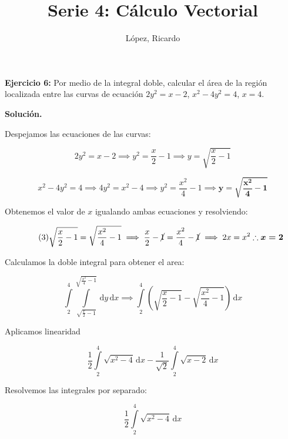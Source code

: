\documentclass[12pt]{article}
\title{Serie 4: Cálculo Vectorial}
\author{López, Ricardo}
\begin{document}
	
\newcommand{\Int}{\int\limits}

\noindent \textbf{Ejercicio 6:} Por medio de la integral doble, calcular el área de la región localizada entre las curvas de ecuación $2y^2=x-2$, $x^2-4y^2=4$, $x=4$.

\vspace{5mm}

\noindent \textbf{Solución.}

\vspace{5mm}

\noindent Despejamos las ecuaciones de las curvas:

\begin{equation}\tag{1}
	2y^2 = x-2 \implies y^2 = \frac{x}{2}-1 \implies y = \sqrt{\frac{x}{2}-1}
\end{equation}

\begin{equation}\tag{2}
	x^2-4y^2=4 \implies 4y^2=x^2-4 \implies y^2=\frac{x^2}{4}-1 \implies \boldsymbol{y=\sqrt{\frac{x^2}{4}-1}} 
\end{equation}

\noindent Obtenemos el valor de $x$ igualando ambas ecuaciones y resolviendo:

\begin{equation}\tag{3}
	\sqrt{\frac{x}{2}-1}=\sqrt{\frac{x^2}{4}-1} \implies \frac{x}{2}-\cancel{1}=\frac{x^2}{4}-\cancel{1} \implies 2x = x^2 \therefore \boldsymbol{x=2}
\end{equation}

\noindent Calculamos la doble integral para obtener el area:

\begin{equation}\tag{4}
	\Int_2^4 \Int_{\sqrt{\frac{x}{2}-1}}^{\sqrt{\frac{x^2}{4}-1}} \, \mathrm{d}y \,\mathrm{d}x \implies \Int_2^4 \left(\sqrt{\frac{x}{2}-1} - \sqrt{\frac{x^2}{4}-1}\right)\, \mathrm{d}x
\end{equation}

\noindent Aplicamos linearidad

\begin{equation}\label{eqn:5}\tag{5}
	\frac{1}{2} \Int_2^4 \sqrt{x^2-4}\, \mathrm{d}x - \frac{1}{\sqrt{2}} \Int_2^4 \sqrt{x-2}\, \mathrm{d}x
\end{equation}

\noindent Resolvemos las integrales por separado:

\begin{equation}\label{eqn:6}\tag{6}
	\frac{1}{2} \Int_2^4 \sqrt{x^2-4}\, \mathrm{d}x
\end{equation}
\end{document}
